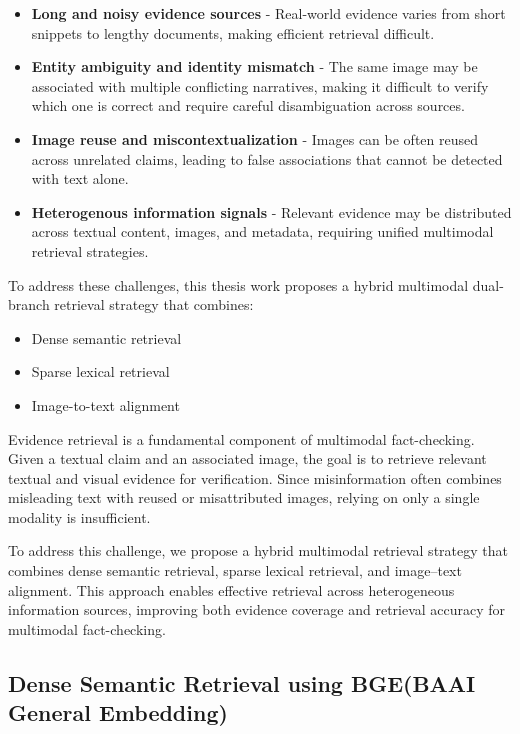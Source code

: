 \begin{itemize}
    \item \textbf{Long and noisy evidence sources} - Real-world evidence varies from short snippets to lengthy documents, making efficient retrieval difficult.
    \item \textbf{Entity ambiguity and identity mismatch} - The same image may be associated with multiple conflicting narratives, making it difficult to verify which one is correct and require careful disambiguation across sources.
    \item \textbf{Image reuse and miscontextualization} - Images can be often reused across unrelated claims, leading to false associations that cannot be detected with text alone.
    \item \textbf{Heterogenous information signals} - Relevant evidence may be distributed across textual content, images, and metadata, requiring unified multimodal retrieval strategies.
\end{itemize}

To address these challenges, this thesis work proposes a hybrid multimodal dual-branch retrieval strategy that combines:
\begin{itemize}
    \item Dense semantic retrieval
    \item Sparse lexical retrieval
    \item Image-to-text alignment
\end{itemize}

\noindent
Evidence retrieval is a fundamental component of multimodal fact-checking. Given a textual claim and an associated image, the goal is to retrieve relevant textual and visual evidence for verification. Since misinformation often combines misleading text with reused or misattributed images, relying on only a single modality is insufficient.

To address this challenge, we propose a hybrid multimodal retrieval strategy that combines dense semantic retrieval, sparse lexical retrieval, and image–text alignment. This approach enables effective retrieval across heterogeneous information sources, improving both evidence coverage and retrieval accuracy for multimodal fact-checking.


\subsection{Dense Semantic Retrieval using BGE(BAAI General Embedding)}

